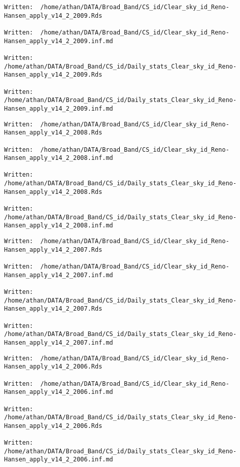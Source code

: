\documentclass[
  10pt,
  a4paper,oneside]{article}
\begin{document}
\begin{verbatim}
Written:  /home/athan/DATA/Broad_Band/CS_id/Clear_sky_id_Reno-Hansen_apply_v14_2_2009.Rds 

Written:  /home/athan/DATA/Broad_Band/CS_id/Clear_sky_id_Reno-Hansen_apply_v14_2_2009.inf.md 

Written:  /home/athan/DATA/Broad_Band/CS_id/Daily_stats_Clear_sky_id_Reno-Hansen_apply_v14_2_2009.Rds 

Written:  /home/athan/DATA/Broad_Band/CS_id/Daily_stats_Clear_sky_id_Reno-Hansen_apply_v14_2_2009.inf.md 
\end{verbatim}

\begin{verbatim}
Written:  /home/athan/DATA/Broad_Band/CS_id/Clear_sky_id_Reno-Hansen_apply_v14_2_2008.Rds 

Written:  /home/athan/DATA/Broad_Band/CS_id/Clear_sky_id_Reno-Hansen_apply_v14_2_2008.inf.md 

Written:  /home/athan/DATA/Broad_Band/CS_id/Daily_stats_Clear_sky_id_Reno-Hansen_apply_v14_2_2008.Rds 

Written:  /home/athan/DATA/Broad_Band/CS_id/Daily_stats_Clear_sky_id_Reno-Hansen_apply_v14_2_2008.inf.md 
\end{verbatim}

\begin{verbatim}
Written:  /home/athan/DATA/Broad_Band/CS_id/Clear_sky_id_Reno-Hansen_apply_v14_2_2007.Rds 

Written:  /home/athan/DATA/Broad_Band/CS_id/Clear_sky_id_Reno-Hansen_apply_v14_2_2007.inf.md 

Written:  /home/athan/DATA/Broad_Band/CS_id/Daily_stats_Clear_sky_id_Reno-Hansen_apply_v14_2_2007.Rds 

Written:  /home/athan/DATA/Broad_Band/CS_id/Daily_stats_Clear_sky_id_Reno-Hansen_apply_v14_2_2007.inf.md 
\end{verbatim}

\begin{verbatim}
Written:  /home/athan/DATA/Broad_Band/CS_id/Clear_sky_id_Reno-Hansen_apply_v14_2_2006.Rds 

Written:  /home/athan/DATA/Broad_Band/CS_id/Clear_sky_id_Reno-Hansen_apply_v14_2_2006.inf.md 

Written:  /home/athan/DATA/Broad_Band/CS_id/Daily_stats_Clear_sky_id_Reno-Hansen_apply_v14_2_2006.Rds 

Written:  /home/athan/DATA/Broad_Band/CS_id/Daily_stats_Clear_sky_id_Reno-Hansen_apply_v14_2_2006.inf.md 
\end{verbatim}
\end{document}
